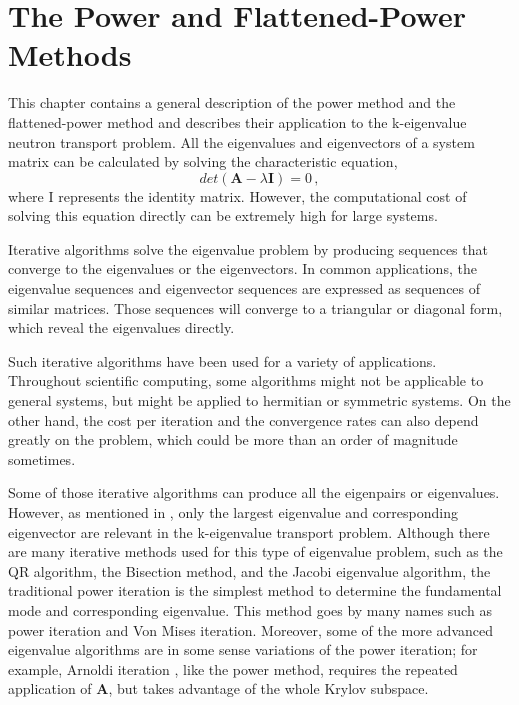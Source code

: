 \cleardoublepage

\chapter{The Power and Flattened-Power Methods}
\label{chapter:PM}

This chapter contains a general description of the power method and the flattened-power method and describes their application to the k-eigenvalue neutron transport problem.
All the eigenvalues and eigenvectors of a system matrix can be calculated by solving the characteristic equation,
\begin{equation}
det(\mathbf{A} -\lambda \mathbf{I} ) = 0 \, ,
\label{eq:characteristic}
\end{equation}
where I represents the identity matrix.
However, the computational cost of solving this equation directly can be extremely high for large systems. 

Iterative algorithms solve the eigenvalue problem by producing sequences that converge to the eigenvalues or the eigenvectors.
In common applications, the eigenvalue sequences and eigenvector sequences are expressed as sequences of similar matrices. 
Those sequences will converge to a triangular or diagonal form, which reveal the eigenvalues directly. 

Such iterative algorithms have been used for a variety of applications.
Throughout scientific computing, some algorithms might not be applicable to general systems, but might be applied to hermitian or symmetric systems.
On the other hand, the cost per iteration and the convergence rates can also depend greatly on the problem, which could be more than an order of magnitude sometimes. 

Some of those iterative algorithms can produce all the eigenpairs or eigenvalues. 
However, as mentioned in , only the largest eigenvalue and corresponding eigenvector are relevant in the k-eigenvalue transport problem.
Although there are many iterative methods used for this type of eigenvalue problem, such as the QR algorithm, the Bisection method, and the Jacobi eigenvalue algorithm, the traditional power iteration is the simplest method to determine the fundamental mode and corresponding eigenvalue.
This method goes by many names such as power iteration and Von Mises iteration\cite{mises1929praktische}.
Moreover, some of the more advanced eigenvalue algorithms are in some sense variations of the power iteration; for example, Arnoldi iteration \cite{arnoldi1951principle}, like the power method, requires the repeated application of $\mathbf{A}$, but takes advantage of the whole Krylov subspace. 

